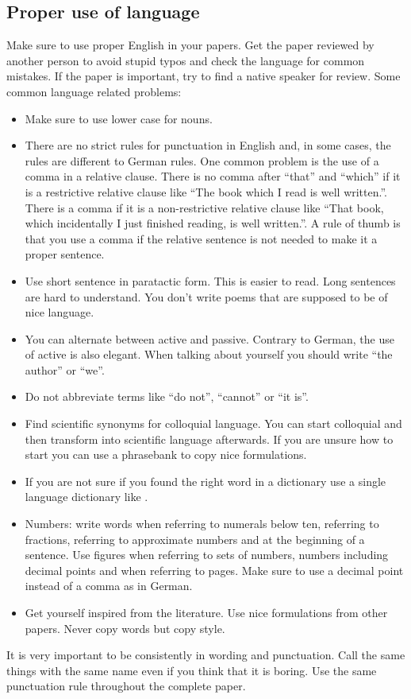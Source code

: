 \documentclass[conference]{IEEEtran}
\begin{document}
\subsection{Proper use of language}
Make sure to use proper English in your papers. Get the paper reviewed by another person to avoid stupid typos and check the language for common mistakes. If the paper is important, try to find a native speaker for review. Some common language related problems:
\begin{itemize}
\item Make sure to use lower case for nouns.
\item There are no strict rules for punctuation in English and, in some cases, the rules are different to German rules. One common problem is the use of a comma in a relative clause. There is no comma after ``that'' and ``which'' if it is a restrictive relative clause like ``The book which I read is well written.''. There is a comma if it is a non-restrictive relative clause like ``That book, which incidentally I just finished reading, is well written.''. A rule of thumb is that you use a comma if the relative sentence is not needed to make it a proper sentence.
\item Use short sentence in paratactic form. This is easier to read. Long sentences are hard to understand. You don't write poems that are supposed to be of nice language.
\item You can alternate between active and passive. Contrary to German, the use of active is also elegant. When talking about yourself you should write ``the author'' or ``we''. 
\item Do not abbreviate terms like ``do not'', ``cannot'' or ``it is''.
\item Find scientific synonyms for colloquial language. You can start colloquial and then transform into scientific language afterwards. If you are unsure how to start you can use a phrasebank \cite{Phrasebank} to copy nice formulations.
\item If you are not sure if you found the right word in a dictionary use a single language dictionary like \cite{Weblink}.
\item Numbers: write words when referring to numerals below ten, referring to fractions, referring to approximate numbers and at the beginning of a sentence. Use figures when referring to sets of numbers, numbers including decimal points and when referring to pages. Make sure to use a decimal point instead of a comma as in German. 
\item	Get yourself inspired from the literature. Use nice formulations from other papers. Never copy words but copy style.  
\end{itemize} 
It is very important to be consistently in wording and punctuation. Call the same things with the same name even if you think that it is boring. Use the same punctuation rule throughout the complete paper. 
\end{document}
